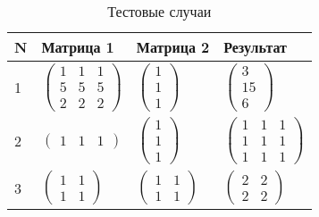 \begin{table}
	\begin{center}
		\captionsetup{singlelinecheck = false, justification=centering}
		\caption{Тестовые случаи}
		\begin{tabular}{l|l|l|l}
			N & Матрица 1 & Матрица 2 & Результат \\ 
			\hline
			\vspace{2mm}
			\vspace{2mm}
			1 & $\begin{pmatrix}
				1 & 1 & 1\\
				5 & 5 & 5\\
				2 & 2 & 2
			\end{pmatrix}$ &
			$\begin{pmatrix}
				1 \\
				1 \\
				1 
			\end{pmatrix}$ &
			$\begin{pmatrix}
				3 \\
				15 \\
				6
			\end{pmatrix}$ \\
			\vspace{2mm}
			\vspace{2mm}
			2 & $\begin{pmatrix}
				1 & 1 & 1
			\end{pmatrix}$ &
			$\begin{pmatrix}
				1 \\
				1 \\
				1
			\end{pmatrix}$ &
			$\begin{pmatrix}
				1 & 1 & 1\\
				1 & 1 & 1 \\
				1 & 1 & 1
			\end{pmatrix}$ \\
			\vspace{2mm}
			\vspace{2mm}
			3 & $\begin{pmatrix}
				1 & 1 \\
				1 & 1
			\end{pmatrix}$ &
			$\begin{pmatrix}
				1 & 1\\
				1 & 1
			\end{pmatrix}$ &
			$\begin{pmatrix}
				2 & 2\\
				2 & 2
			\end{pmatrix}$ \\

\end{tabular}
\end{center}
\end{table}
